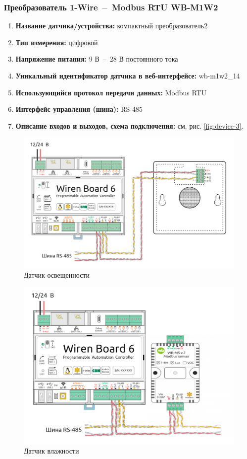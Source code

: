 \documentclass[a4paper,14pt]{extarticle}
\begin{document}
\subsubsection*{Преобразователь 1-Wire~--~Modbus RTU WB-M1W2}
\begin{enumerate}
	\item \textbf{Название датчика/устройства:} компактный преобразователь2
	
	\item \textbf{Тип измерения:} цифровой
	
	\item  \textbf{Напряжение питания:} 9 В~--~28 В постоянного тока
	
	\item  \textbf{Уникальный идентификатор датчика в веб-интерфейсе:} wb-m1w2\_14
	
	\item  \textbf{Использующийся протокол передачи данных:} Modbus RTU
	
	\item  \textbf{Интерфейс управления (шина):} RS-485
	
	\item  \textbf{Описание входов и выходов, схема подключения:} см. рис. \ref{fig:device-3}.
	
\end{enumerate}

\begin{figure}[h!]
	\centering
	\includegraphics[width=0.5\linewidth]{images/device-1}
	\caption{Датчик освещенности}
	\label{fig:device-1}
\end{figure}

\begin{figure}[h!]
	\centering
	\includegraphics[width=0.5\linewidth]{images/device-2}
	\caption{Датчик влажности}
	\label{fig:device-2}
\end{figure}
\end{document}
